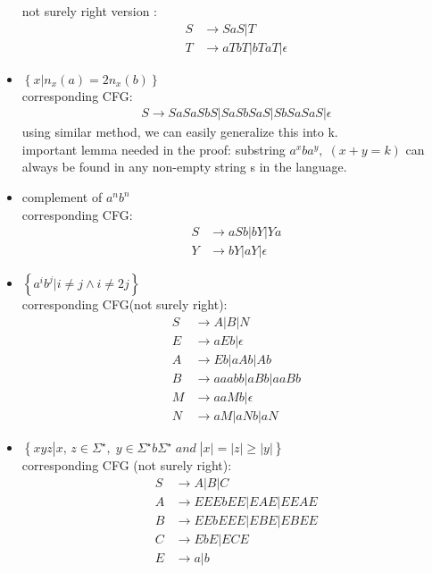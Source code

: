 \documentclass{article}
\begin{document}
\begin{itemize}
            not surely right version : 
            \begin{align*}
                S&\rightarrow SaS | T \\
                T&\rightarrow aTbT | bTaT | \epsilon
            \end{align*}
        \item $\left\{x | n_x(a)=2n_x(b)\right\}$  \\ corresponding CFG:
            \begin{align*}
                S \rightarrow SaSaSbS | SaSbSaS | SbSaSaS | \epsilon
            \end{align*}
            using similar method, we can easily generalize this into k.\\
            important lemma needed in the proof: substring $a^xba^y,\; (x+y=k)$ can always be found in any non-empty string s in the language.
        \item complement of $a^nb^n$ \\ corresponding CFG:
            \begin{align*}
                S & \rightarrow aSb | bY | Ya \\
                Y & \rightarrow bY | aY | \epsilon
            \end{align*}
        \item $\left\{ a^ib^j | i\neq j \wedge i \neq 2j\right\}$ \\ corresponding CFG(not surely right):
            \begin{align*}
                S & \rightarrow A | B | N\\
                E & \rightarrow aEb | \epsilon\\
                A & \rightarrow Eb | aAb | Ab\\
                B & \rightarrow aaabb | aBb | aaBb \\
                M & \rightarrow aaMb | \epsilon\\
                N & \rightarrow aM | aNb | aN
            \end{align*}
        \item $\left\{xyz|x,\,z\in \Sigma^\star ,\; y\in \Sigma^\star b \Sigma^\star \; and \; |x|=|z|\geq |y|\right\}$ \\ corresponding CFG (not surely right):
            \begin{align*}
                S & \rightarrow A|B|C\\
                A & \rightarrow EEEbEE | EAE | EEAE \\ 
                B & \rightarrow EEbEEE | EBE | EBEE \\
                C & \rightarrow EbE | ECE\\
                E & \rightarrow a|b
            \end{align*}
    \end{itemize}

   
    
    
    
    

    
\end{document}
